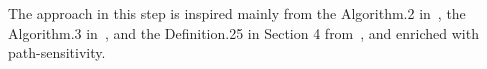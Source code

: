 The approach in this step is inspired mainly from the Algorithm.2 in~\cite{SinnZV14},
  the Algorithm.3 in~\cite{ZulegerGSV11},
  and the Definition.25 in Section 4 from~\cite{SinnZV17}, and enriched with path-sensitivity.


